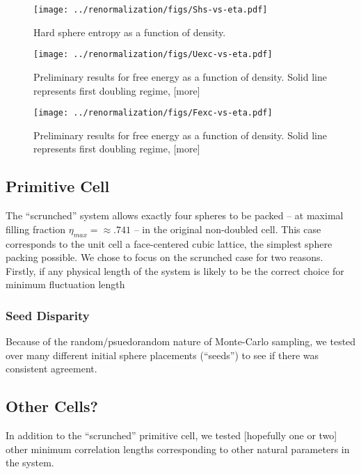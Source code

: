 \documentclass[12pt]{article}
\newcommand{\ignore}[1]{}
\begin{document}
\begin{figure}
\centering
    \texttt{[image: ../renormalization/figs/Shs-vs-eta.pdf]}
    \caption{Hard sphere entropy as a function of density.}
    \label{Shs-eta}
\end{figure}
\ignore{Filling fraction or density? Value in distinction? We never use number density for the sake of units...}


\begin{figure}
    \centering
    \texttt{[image: ../renormalization/figs/Uexc-vs-eta.pdf]}
    \caption{Preliminary results for free energy as a function of density. Solid line represents first doubling regime, [more]}
    \label{U-eta}
\end{figure}


\begin{figure}
\centering
    \texttt{[image: ../renormalization/figs/Fexc-vs-eta.pdf]}
    \caption{Preliminary results for free energy as a function of density. Solid line represents first doubling regime, [more]}
    \label{F-eta}
\end{figure}

\subsection{Primitive Cell}
The ``scrunched'' system allows exactly four spheres to be packed -- at maximal filling fraction $\eta_{max} = \approx .741$ -- in the original non-doubled cell. This case corresponds to the unit cell a face-centered cubic lattice, the simplest sphere packing possible. We chose to focus on the scrunched case for two reasons. Firstly, if any physical length of the system is likely to be the correct choice for minimum fluctuation length 

\subsubsection{Seed Disparity}
Because of the random/psuedorandom nature of Monte-Carlo sampling, we tested over many different initial sphere placements (``seeds'') to see if there was consistent agreement. 
\subsection{Other Cells?}
In addition to the ``scrunched'' primitive cell, we tested [hopefully one or two] other minimum correlation lengths corresponding to other natural parameters in the system.
\end{document}
